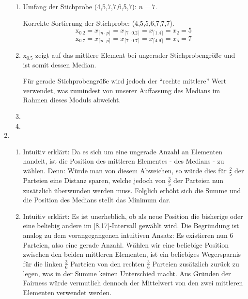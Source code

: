 \documentclass[a4paper]{scrartcl}
\def \blattnr {6}
\begin{document}
\begin{enumerate}[label=\bfseries \blattnr.\arabic*]
\begin{enumerate}
 \item 
    Umfang der Stichprobe (4,5,7,7,6,5,7): $n=7$.
    
    Korrekte Sortierung der Stichprobe: (4,5,5,6,7,7,7).
    \begin{equation*}
    \text{\~{x}}_{0.2} = x_{\lceil n \cdot p \rceil} = x_{\lceil 7 \cdot 0.2 \rceil} = x_{\lceil 1.4 \rceil} = x_2 = 5     
    \end{equation*}
    \begin{equation*}
    \text{\~{x}}_{0.7} = x_{\lceil n \cdot p \rceil} = x_{\lceil 7 \cdot 0.7 \rceil} = x_{\lceil 4.9 \rceil} = x_5 = 7     
    \end{equation*}
    
 \item
    $\text{\~{x}}_{0.5}$ zeigt auf das mittlere Element bei ungerader Stichprobengröße und ist somit dessen Median.
    
    Für gerade Stichprobengröße wird jedoch der ``rechte mittlere'' Wert verwendet, was zumindest von unserer Auffassung des 
    Medians im Rahmen dieses Moduls abweicht.
 \item 
 \item 
\end{enumerate}


\item 

\begin{enumerate}
 \item 
 Intuitiv erklärt: Da es sich um eine ungerade Anzahl an Elementen handelt, ist die Position des mittleren Elementes - des Medians - zu wählen.
 Denn: Würde man von diesem Abweichen, so würde dies für $\frac25$ der Parteien eine Distanz sparen, welche jedoch von $\frac35$ der Parteien 
 nun zusätzlich überwunden werden muss. Folglich erhöht sich die Summe und die Position des Medians stellt das Minimum dar.
 
 \item 
 Intuitiv erklärt: Es ist unerheblich, ob als neue Position die bisherige oder eine beliebig andere im [8,17]-Intervall gewählt wird. Die Begründung
 ist analog zu dem vorangegangenen intuitiven Ansatz: Es existieren nun 6 Parteien, also eine gerade Anzahl. 
 Wählen wir eine beliebige Position zwischen den beiden mittleren Elementen, ist ein beliebiges Wegersparnis für die linken $\frac36$ Parteien von den 
 rechten $\frac36$ Parteien zusätzlich zurück zu legen, was in der Summe keinen Unterschied macht. Aus Gründen der Fairness würde vermutlich dennoch der 
 Mittelwert von den zwei mittleren Elementen verwendet werden.
 
\end{enumerate}

\end{enumerate}
\end{document}
